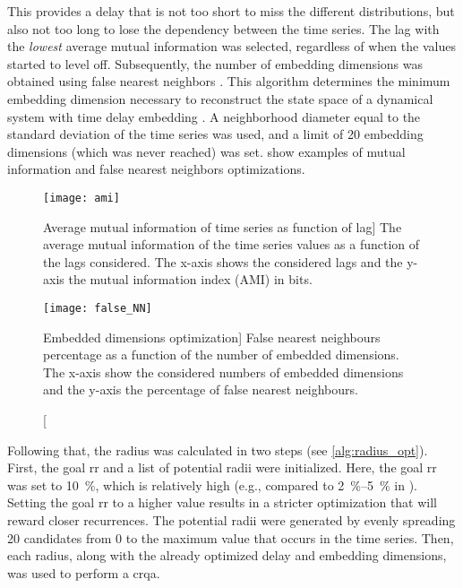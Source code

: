 %
This provides a delay that is not too short to miss the different distributions, but also not too long to lose the dependency between the time series.
The lag with the \emph{lowest} average mutual information was selected, regardless of when the values started to level off.
Subsequently, the number of embedding dimensions was obtained using false nearest neighbors \citep{Kennel1992determining}.
This algorithm determines the minimum embedding dimension necessary to reconstruct the state space of a dynamical system with time delay embedding \citep{Abarbanel1993local}.
A neighborhood diameter equal to the standard deviation of the time series was used, and a limit of 20 embedding dimensions (which was never reached) was set.
 show examples of mutual information and false nearest neighbors optimizations.
%
\begin{figure}[H]
	\centering
	\begin{minipage}{.45\linewidth}
		\centering
		\texttt{[image: ami]}
		\caption
		[Average mutual information of time series as function of lag]
		{The average mutual information of the time series values as a function of the lags considered.
			The x-axis shows the considered lags and the y-axis the mutual information index (AMI) in bits.}
		\label{fig:ami}
	\end{minipage}%
	\hfill
	\begin{minipage}{.45\linewidth}
		\centering
		\texttt{[image: false\_NN]}
		\caption
		[Embedded dimensions optimization]
		{False nearest neighbours percentage as a function of the number of embedded dimensions.
			The x-axis show the considered numbers of embedded dimensions and the y-axis the percentage of false nearest neighbours.}
		\label{fig:false_nn}
	\end{minipage}	
\end{figure}
%
Following that, the radius was calculated in two steps (see \cref{alg:radius_opt}).
First, the goal \ac{rr} and a list of potential radii were initialized.
Here, the goal \ac{rr} was set to \SI{10}{\percent}, which is relatively high (e.g., compared to \SIrange{2}{5}{\percent} in \citet{Coco2014crqa-r}).
Setting the goal \ac{rr} to a higher value results in a stricter optimization that will reward closer recurrences.
The potential radii were generated by evenly spreading 20 candidates from 0 to the maximum value that occurs in the time series.
Then, each radius, along with the already optimized delay and embedding dimensions, was used to perform a \ac{crqa}.
